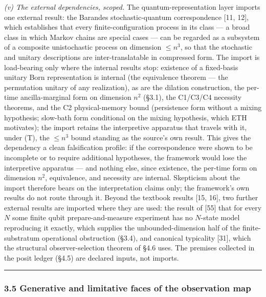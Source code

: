 \documentclass[
]{article}
\begin{document}
\emph{(v) The external dependencies, scoped.} The quantum-representation
layer imports one external result: the Barandes stochastic-quantum
correspondence {[}11, 12{]}, which establishes that every
finite-configuration process in its class --- a broad class in which
Markov chains are special cases --- can be regarded as a subsystem of a
composite unistochastic process on dimension \(\leq n^3\), so that the
stochastic and unitary descriptions are inter-translatable in compressed
form. The import is load-bearing only where the internal results stop:
existence of a fixed-basis unitary Born representation is internal (the
equivalence theorem --- the permutation unitary of any realization), as
are the dilation construction, the per-time ancilla-marginal form on
dimension \(n^2\) (§3.1), the C1/C3/C4 necessity theorems, and the C2
physical-memory bound (persistence form without a mixing hypothesis;
slow-bath form conditional on the mixing hypothesis, which ETH
motivates); the import retains the interpretive apparatus that travels
with it, under (T), the \(\leq n^3\) bound standing as the source's own
result. This gives the dependency a clean falsification profile: if the
correspondence were shown to be incomplete or to require additional
hypotheses, the framework would lose the interpretive apparatus --- and
nothing else, since existence, the per-time form on dimension \(n^2\),
equivalence, and necessity are internal. Skepticism about the import
therefore bears on the interpretation claims only; the framework's own
results do not route through it. Beyond the textbook results {[}15,
16{]}, two further external results are imported where they are used:
the result of {[}55{]} that for every \(N\) some finite qubit
prepare-and-measure experiment has no \(N\)-state model reproducing it
exactly, which supplies the unbounded-dimension half of the
finite-substratum operational obstruction (§3.4), and canonical
typicality {[}31{]}, which the structural observer-selection theorem of
§4.6 uses. The premises collected in the posit ledger (§4.5) are
declared inputs, not imports.

\begin{center}\rule{0.5\linewidth}{0.5pt}\end{center}

\hypertarget{generative-and-limitative-faces-of-the-observation-map}{%
\subsubsection{3.5 Generative and limitative faces of the observation
map}\label{generative-and-limitative-faces-of-the-observation-map}}
\end{document}
